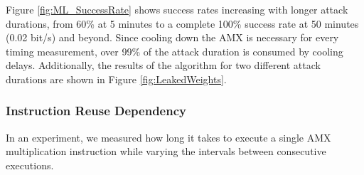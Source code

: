 Figure \ref{fig:ML_SuccessRate} shows success rates increasing with longer attack durations, from 60\% at 5 minutes to a complete 100\% success rate at 50 minutes (0.02 bit/s) and beyond. Since cooling down the AMX is necessary for every timing measurement, over 99\% of the attack duration is consumed by cooling delays. Additionally, the results of the algorithm for two different attack durations are shown in Figure \ref{fig:LeakedWeights}. 








\subsubsection{Instruction Reuse Dependency} \label{sec:stages}
In an experiment, we measured how long it takes to execute a single AMX multiplication instruction while varying the intervals between consecutive executions. 




